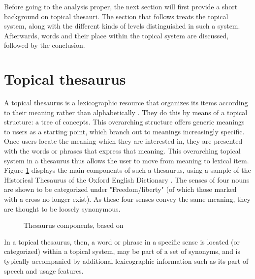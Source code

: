 Before going to the analysis proper, the next section will first provide a short background on topical thesauri. The section that follows treats the topical system, along with the different kinds of levels distinguished in such a system. Afterwards, words and their place within the topical system are discussed, followed by the conclusion.



\section{Topical thesaurus}

A topical thesaurus is a lexicographic resource that organizes its items according to their meaning rather than alphabetically \cite{brown_thesauruses_2006} \cite{kay_diachronic_2016}. They do this by means of a topical structure: a tree of concepts. This overarching structure offers generic meanings to users as a starting point, which branch out to meanings increasingly specific. Once users locate the meaning which they are interested in, they are presented with the words or phrases that express that meaning. This overarching topical system in a thesaurus thus allows the user to move from meaning to lexical item. Figure \ref{fig:Stolk2019a:HTE} displays the main components of such a thesaurus, using a sample of the Historical Thesaurus of the Oxford English Dictionary \cite{ref-HTOED}. The senses of four nouns are shown to be categorized under "Freedom/liberty" (of which those marked with a cross no longer exist). As these four senses convey the same meaning, they are thought to be loosely synonymous.

\begin{figure}[htbp]
	\framebox[\textwidth]{
		\scalebox{0.65}[0.65]{
			
		}
	}
	\caption[]{\label{fig:Stolk2019a:HTE} Thesaurus components, based on \cite{ref-HTOED-Online}}
\end{figure} 

In a topical thesaurus, then, a word or phrase in a specific sense is located (or categorized) within a topical system, may be part of a set of synonyms, and is typically accompanied by additional lexicographic information such as its part of speech and usage features.


